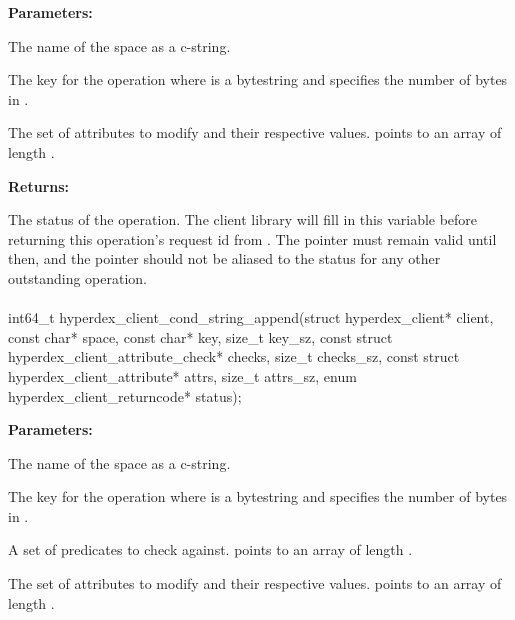 \noindent\textbf{Parameters:}
\begin{description}[labelindent=\widthof{{\code{attrs}, \code{attrs\_sz}}},leftmargin=*,noitemsep,nolistsep,align=right]
\item[\code{space}] The name of the space as a c-string.
\item[\code{key}, \code{key\_sz}] The key for the operation where  is a bytestring and  specifies the number of bytes in .
\item[\code{attrs}, \code{attrs\_sz}] The set of attributes to modify and their respective values.   points to an array of length .
\end{description}

\noindent\textbf{Returns:}
\begin{description}[labelindent=\widthof{{\code{status}}},leftmargin=*,noitemsep,nolistsep,align=right]
\item[\code{status}] The status of the operation.  The client library will fill in this variable before returning this operation's request id from .  The pointer must remain valid until then, and the pointer should not be aliased to the status for any other outstanding operation.
\end{description}

\paragraph{}
\begin{ccode}
int64_t hyperdex_client_cond_string_append(struct hyperdex_client* client,
                const char* space,
                const char* key, size_t key_sz,
                const struct hyperdex_client_attribute_check* checks, size_t checks_sz,
                const struct hyperdex_client_attribute* attrs, size_t attrs_sz,
                enum hyperdex_client_returncode* status);
\end{ccode}
\funcdesc 

\noindent\textbf{Parameters:}
\begin{description}[labelindent=\widthof{{\code{checks}, \code{checks\_sz}}},leftmargin=*,noitemsep,nolistsep,align=right]
\item[\code{space}] The name of the space as a c-string.
\item[\code{key}, \code{key\_sz}] The key for the operation where  is a bytestring and  specifies the number of bytes in .
\item[\code{checks}, \code{checks\_sz}] A set of predicates to check against.   points to an array of length .
\item[\code{attrs}, \code{attrs\_sz}] The set of attributes to modify and their respective values.   points to an array of length .
\end{description}

